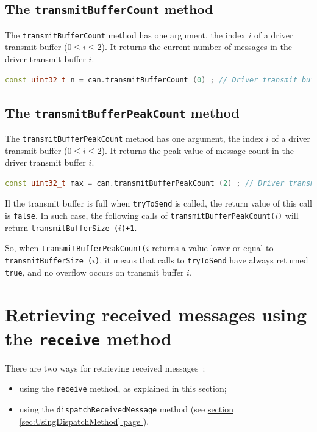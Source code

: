 \documentclass[10pt, a4paper, obeyspaces, openany]{extarticle}
\newcommand \sectionLabel[2]{\section{#1}\label{sec:#2}}
\newcommand\refSectionPage[1]{\hyperref[sec:#1]{section \ref*{sec:#1} page \pageref{sec:#1}}}
\begin{document}
\subsection{The \texttt{transmitBufferCount} method}

The \texttt{transmitBufferCount} method has one argument, the index $i$ of a driver transmit buffer ($0 \leqslant i \leqslant 2$). It returns the current number of messages in the driver transmit buffer $i$.
{ \small\begin{lstlisting}[language=c++]
const uint32_t n = can.transmitBufferCount (0) ; // Driver transmit buffer 0
\end{lstlisting}}


\subsection{The \texttt{transmitBufferPeakCount} method}

The \texttt{transmitBufferPeakCount} method has one argument, the index $i$ of a driver transmit buffer ($0 \leqslant i \leqslant 2$). It returns the peak value of message count in the driver transmit buffer $i$.
{ \small\begin{lstlisting}[language=c++]
const uint32_t max = can.transmitBufferPeakCount (2) ; // Driver transmit buffer 0
\end{lstlisting}}

Il the transmit buffer is full when \texttt{tryToSend} is called, the return value of this call is \texttt{false}. In such case, the following calls of \texttt{transmitBufferPeakCount($i$)} will return \texttt{transmitBufferSize ($i$)+1}. 

So, when \texttt{transmitBufferPeakCount($i$} returns a value lower or equal to \texttt{transmitBufferSize ($i$)}, it means that calls to \texttt{tryToSend} have always returned \texttt{true}, and no overflow occurs on transmit buffer $i$.

















\sectionLabel{Retrieving received messages using the \texttt{receive} method}{UsingReceiveMethod}

There are two ways for retrieving received messages~:
\begin{itemize}
  \item using the \texttt{receive} method, as explained in this section;
  \item using the \texttt{dispatchReceivedMessage} method (see \refSectionPage{UsingDispatchMethod}).
\end{itemize}
\end{document}
